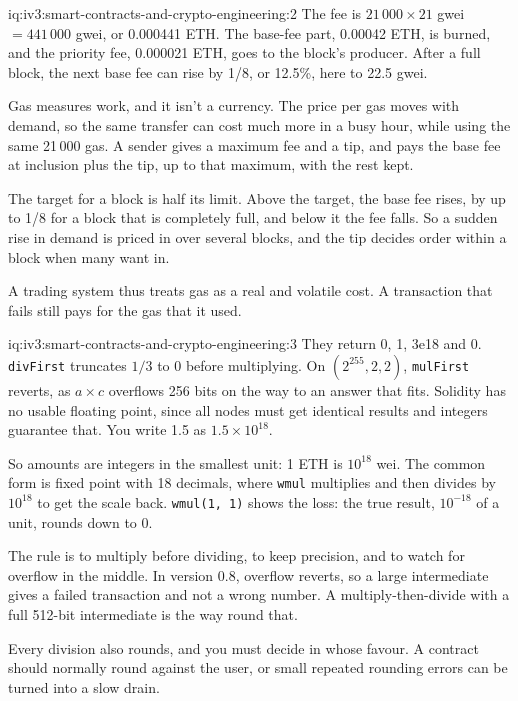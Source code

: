 \begin{solution}{iq:iv3:smart-contracts-and-crypto-engineering:2}
The fee is $21\,000 \times 21$ gwei $= 441\,000$ gwei, or 0.000441 ETH. The base-fee part, 0.00042 ETH, is burned, and the priority fee, 0.000021 ETH, goes to the block's producer. After a full block, the next base fee can rise by 1/8, or 12.5\%, here to 22.5 gwei.

Gas measures work, and it isn't a currency. The price per gas moves with demand, so the same transfer can cost much more in a busy hour, while using the same 21\,000 gas. A sender gives a maximum fee and a tip, and pays the base fee at inclusion plus the tip, up to that maximum, with the rest kept.

The target for a block is half its limit. Above the target, the base fee rises, by up to 1/8 for a block that is completely full, and below it the fee falls. So a sudden rise in demand is priced in over several blocks, and the tip decides order within a block when many want in.

A trading system thus treats gas as a real and volatile cost. A transaction that fails still pays for the gas that it used.

\end{solution}

\begin{solution}{iq:iv3:smart-contracts-and-crypto-engineering:3}
They return 0, 1, 3e18 and 0. \texttt{divFirst} truncates $1/3$ to 0 before multiplying. On $(2^{255}, 2, 2)$, \texttt{mulFirst} reverts, as $a \times c$ overflows 256 bits on the way to an answer that fits. Solidity has no usable floating point, since all nodes must get identical results and integers guarantee that. You write 1.5 as $1.5 \times 10^{18}$.

So amounts are integers in the smallest unit: 1 ETH is $10^{18}$ wei. The common form is fixed point with 18 decimals, where \texttt{wmul} multiplies and then divides by $10^{18}$ to get the scale back. \texttt{wmul(1, 1)} shows the loss: the true result, $10^{-18}$ of a unit, rounds down to 0.

The rule is to multiply before dividing, to keep precision, and to watch for overflow in the middle. In version 0.8, overflow reverts, so a large intermediate gives a failed transaction and not a wrong number. A multiply-then-divide with a full 512-bit intermediate is the way round that.

Every division also rounds, and you must decide in whose favour. A contract should normally round against the user, or small repeated rounding errors can be turned into a slow drain.

\end{solution}

